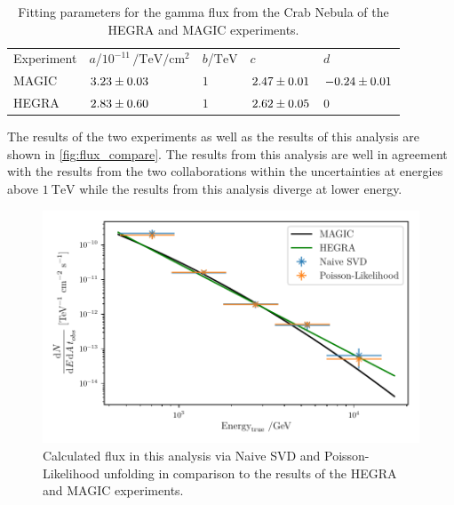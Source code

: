 \begin{table}[tb]
  \centering
  \caption{Fitting parameters for the gamma flux from the Crab Nebula of the HEGRA and MAGIC experiments.}
  \begin{tabular}{l l l l l}
    Experiment & $a$/$10^{-11}\,\si{\per\tera\eV\per\cm\squared}$ & $b$/$\si{\tera\eV}$  & $c$ & $d$ \\
    MAGIC & $\num{3.23 \pm .03}$ & $\num{1}$ & $\num{2.47 \pm .01}$ & $\num{-0.24 \pm .01}$ \\
    HEGRA & $\num{2.83 \pm .6}$ & $\num{1}$ & $\num{2.62 \pm .05}$ & $\num{0 \pm 0}$ \\
  \end{tabular}
  \label{tab:meas}
\end{table}
The results of the two experiments as well as the results of this analysis are shown in \autoref{fig:flux_compare}. The results from this analysis are well in agreement with the results from the two collaborations within the uncertainties at energies above $\SI{1}{\tera\eV}$ while the results from this analysis diverge at lower energy.

\begin{figure}[tb]
  \centering
  \includegraphics[width=.7\textwidth]{plots/flux_compare.pdf}
  \caption{Calculated flux in this analysis via Naive SVD and Poisson-Likelihood unfolding in comparison to the results of the HEGRA and MAGIC experiments.}
  \label{fig:flux_compare}
\end{figure}
